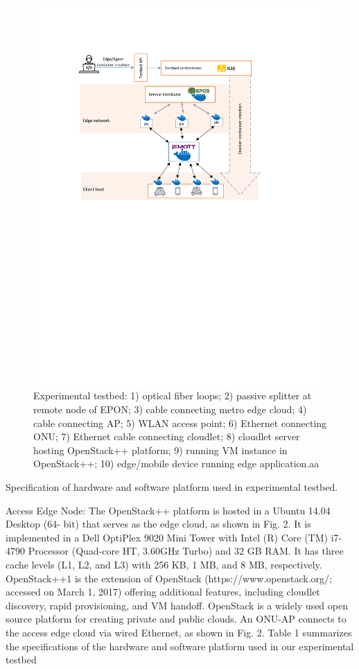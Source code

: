 \documentclass[conference]{IEEEtran}
\begin{document}
\begin{figure}[!htbp]
\centering
\includegraphics[clip, trim=3.3cm 13.7cm 4.5cm 3.5cm, width=\columnwidth]{figures/app1.pdf}
\caption{Experimental testbed: 1) optical fiber loops; 2) passive splitter at remote node of EPON; 3) cable connecting metro edge cloud; 4) cable connecting AP; 5) WLAN access point; 6) Ethernet connecting ONU; 7) Ethernet cable connecting cloudlet; 8) cloudlet server hosting OpenStack++ platform; 9) running VM instance in OpenStack++; 10) edge/mobile device running edge application.aa}
\label{fig:imp}
\end{figure}
Specification of hardware and software platform used in experimental testbed.

\par Access Edge Node: The OpenStack++ platform is hosted in a Ubuntu 14.04 Desktop (64-
bit) that serves as the edge cloud, as shown in 
Fig. 2. It is implemented in a Dell OptiPlex 9020 
Mini Tower with Intel (R) Core (TM) i7-4790 Processor (Quad-core HT, 3.60GHz Turbo) and 32 
GB RAM. It has three cache levels (L1, L2, and 
L3) with 256 KB, 1 MB, and 8 MB, respectively. OpenStack++1 is the extension of OpenStack 
(https://www.openstack.org/; accessed on March 
1, 2017) offering additional features, including 
cloudlet discovery, rapid provisioning, and VM 
handoff. OpenStack is a widely used open source 
platform for creating private and public clouds. 
An ONU-AP connects to the access edge cloud 
via wired Ethernet, as shown in Fig. 2. Table 1 
summarizes the specifications of the hardware 
and software platform used in our experimental 
testbed
\end{document}
